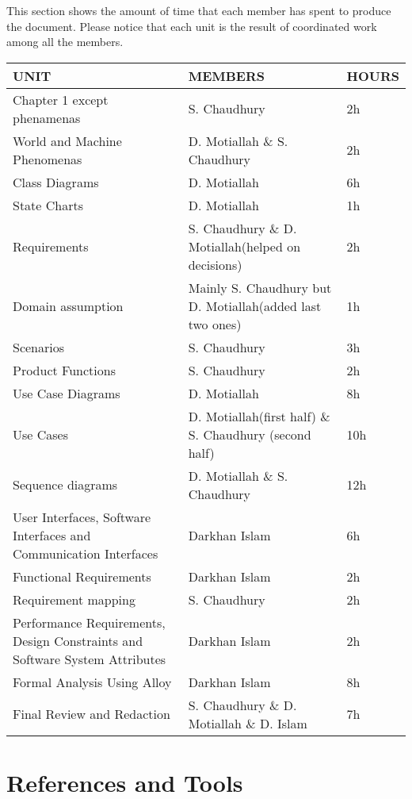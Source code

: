 This section shows the amount of time that each member has spent to produce the document. Please notice that each unit is the result of coordinated work among all the members.

\begin{table}[h]
\centering
\begin{tabularx}{\textwidth}{| X | X | X |}
\hline
\textbf{UNIT} & \textbf{MEMBERS} & \textbf{HOURS} \\ [1ex]
\hline
Chapter 1 except phenamenas & S. Chaudhury  & 2h \\ [1ex]
\hline
World and Machine Phenomenas & D. Motiallah \& S. Chaudhury & 2h \\ [1ex]
\hline
Class Diagrams & D. Motiallah & 6h \\ [1ex]
\hline
State Charts & D. Motiallah & 1h \\ [1ex]
\hline
Requirements & S. Chaudhury \& D. Motiallah(helped on decisions) & 2h \\ [1ex]
\hline
Domain assumption & Mainly S. Chaudhury but D. Motiallah(added last two ones) & 1h \\ [1ex]
\hline
Scenarios & S. Chaudhury & 3h \\ [1ex]
\hline
Product Functions & S. Chaudhury & 2h \\ [1ex]
\hline
Use Case Diagrams & D. Motiallah & 8h \\ [1ex]
\hline
Use Cases & D. Motiallah(first half) \& S. Chaudhury (second half) & 10h \\ [1ex]
\hline
Sequence diagrams & D. Motiallah \& S. Chaudhury & 12h \\ [1ex]
\hline
User Interfaces, Software Interfaces and Communication Interfaces & Darkhan Islam & 6h \\ [1ex]
\hline
Functional Requirements & Darkhan Islam & 2h \\ [1ex]
\hline
Requirement mapping & S. Chaudhury & 2h \\ [1ex]
\hline
Performance Requirements, Design Constraints and Software System Attributes & Darkhan Islam & 2h \\ [1ex]
\hline
Formal Analysis Using Alloy & Darkhan Islam & 8h \\ [1ex]
\hline
Final Review and Redaction & S. Chaudhury \& D. Motiallah \& D. Islam & 7h \\ [1ex]
\hline
\end{tabularx}
\end{table}

\section{References and Tools}

